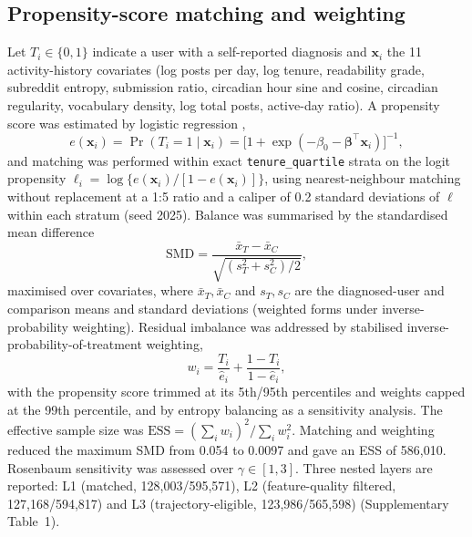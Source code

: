 \documentclass[11pt]{article}
\newcommand{\suptab}[1]{Supplementary Table~#1}
\begin{document}
\subsection*{Propensity-score matching and weighting}
Let $T_i\in\{0,1\}$ indicate a user with a self-reported diagnosis and $\mathbf{x}_i$ the 11 activity-history
covariates (log posts per day, log tenure, readability grade, subreddit entropy, submission
ratio, circadian hour sine and cosine, circadian regularity, vocabulary density, log total
posts, active-day ratio). A propensity score was estimated by logistic regression
\cite{rosenbaum1983central,stuart2010matching},
\begin{equation}
e(\mathbf{x}_i)=\Pr(T_i=1\mid \mathbf{x}_i)=\bigl[1+\exp(-\beta_0-\boldsymbol{\beta}^{\!\top}\mathbf{x}_i)\bigr]^{-1},
\label{eq:ps}
\end{equation}
and matching was performed within exact \texttt{tenure\_quartile} strata on the logit propensity
$\ell_i=\log\{e(\mathbf{x}_i)/[1-e(\mathbf{x}_i)]\}$, using nearest-neighbour matching without
replacement at a 1:5 ratio and a caliper of 0.2 standard deviations of $\ell$ within each
stratum (seed 2025). Balance was summarised by the standardised mean difference
\begin{equation}
\mathrm{SMD}=\frac{\bar{x}_{T}-\bar{x}_{C}}{\sqrt{(s_{T}^{2}+s_{C}^{2})/2}},
\label{eq:smd}
\end{equation}
maximised over covariates, where $\bar x_{T},\bar x_{C}$ and $s_{T},s_{C}$ are the diagnosed-user
and comparison means and standard deviations (weighted forms under inverse-probability weighting). Residual imbalance was addressed by stabilised
inverse-probability-of-treatment weighting,
\begin{equation}
w_i=\frac{T_i}{\hat e_i}+\frac{1-T_i}{1-\hat e_i},
\label{eq:iptw}
\end{equation}
with the propensity score trimmed at its 5th/95th percentiles and weights capped at the 99th
percentile, and by entropy balancing as a sensitivity analysis. The effective sample size was
$\mathrm{ESS}=(\sum_i w_i)^2/\sum_i w_i^2$. Matching and weighting reduced the maximum SMD from
0.054 to 0.0097 and gave an ESS of 586{,}010. Rosenbaum sensitivity was assessed over
$\gamma\in[1,3]$. Three nested layers are reported: L1 (matched, 128{,}003/595{,}571), L2
(feature-quality filtered, 127{,}168/594{,}817) and L3 (trajectory-eligible,
123{,}986/565{,}598) (\suptab{1}).
\end{document}
